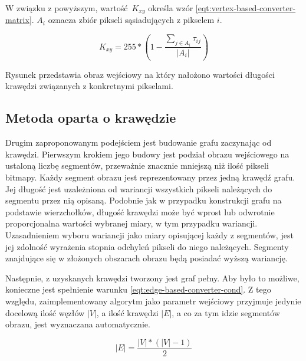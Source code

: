 {{{            W związku z powyższym, wartość $K_{xy}$ określa wzór \ref{eqt:vertex-based-converter-matrix}. $A_i$ oznacza
            zbiór pikseli sąsiadujących z pikselem $i$.

            \begin{equation}\label{eqt:vertex-based-converter-matrix}
                K_{xy} = 255 * (1 - \frac{\sum_{j \in A_i} \tau_{ij}}{|A_i|})
            \end{equation}

            Rysunek przedstawia obraz wejściowy na który nałożono wartości długości krawędzi związanych z konkretnymi
            pikselami.
        }

        \subsection{Metoda oparta o krawędzie}
        {
            Drugim zaproponowanym podejściem jest budowanie grafu zaczynając od krawędzi. Pierwszym krokiem jego budowy
            jest podział obrazu wejściowego na ustaloną liczbę segmentów, przeważnie znacznie mniejszą niż ilość pikseli
            bitmapy. Każdy segment obrazu jest reprezentowany przez jedną krawędź grafu. Jej długość jest uzależniona od
            wariancji wszystkich pikseli należących do segmentu przez nią opisaną. Podobnie jak w przypadku konstrukcji
            grafu na podstawie wierzchołków, długość krawędzi może być wprost lub odwrotnie proporcjonalna wartości
            wybranej miary, w tym przypadku wariancji. Uzasadnieniem wyboru wariancji jako miary opisującej każdy z
            segmentów, jest jej zdolność wyrażenia stopnia odchyleń pikseli do niego należących. Segmenty znajdujące się
            w złożonych obszarach obrazu będą posiadać wyższą wariancję.

            Następnie, z uzyskanych krawędzi tworzony jest graf pełny. Aby było to możliwe, konieczne jest spełnienie
            warunku \ref{eqt:edge-based-converter-cond}. Z tego względu, zaimplementowany algorytm jako parametr
            wejściowy przyjmuje jedynie docelową ilość węzłów $|V|$, a ilość krawędzi $|E|$, a co za tym idzie segmentów
            obrazu, jest wyznaczana automatycznie.

            \begin{equation}\label{eqt:edge-based-converter-cond}
                |E| = \frac{|V| * (|V| - 1)}{2}
            \end{equation}

}}}
